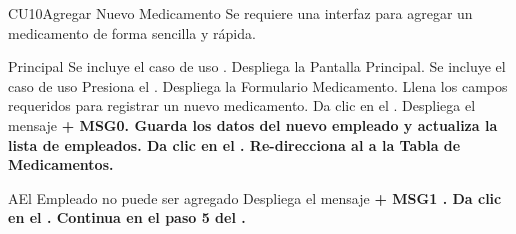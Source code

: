 \begin{UseCase}{CU10}{Agregar Nuevo Medicamento}{
		Se requiere una interfaz para agregar un medicamento de forma sencilla y rápida.
	}
	\end{UseCase}
	\begin{UCtrayectoria}{Principal}
		\UCpaso Se incluye el caso de uso .
		\UCpaso Despliega la  {Pantalla Principal}.
		\UCpaso Se incluye el caso de uso 
		\UCpaso[\UCactor] Presiona el .
		\UCpaso Despliega la  {Formulario Medicamento}.
		\UCpaso [\UCactor] Llena los campos requeridos para registrar un nuevo medicamento. 
		\UCpaso[\UCactor] Da clic en el  .
		\UCpaso Despliega el mensaje \bf {+ MSG0}. 
		\UCpaso Guarda los datos del nuevo empleado y actualiza la lista de empleados.
		\UCpaso[\UCactor] Da clic en el .
		\UCpaso Re-direcciona al \UCactor a la  {Tabla de Medicamentos}.
	
	\end{UCtrayectoria}


		\begin{UCtrayectoriaA}{A}{El Empleado no puede ser agregado}
			\UCpaso Despliega el mensaje \bf {+ MSG1 }.
			\UCpaso[\UCactor] Da clic en el .
			\UCpaso Continua en el paso 5 del .
		\end{UCtrayectoriaA}

